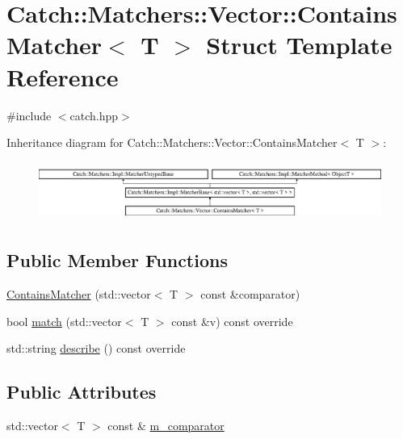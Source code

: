 \hypertarget{structCatch_1_1Matchers_1_1Vector_1_1ContainsMatcher}{}\section{Catch\+:\+:Matchers\+:\+:Vector\+:\+:Contains\+Matcher$<$ T $>$ Struct Template Reference}
\label{structCatch_1_1Matchers_1_1Vector_1_1ContainsMatcher}


{\ttfamily \#include $<$catch.\+hpp$>$}

Inheritance diagram for Catch\+:\+:Matchers\+:\+:Vector\+:\+:Contains\+Matcher$<$ T $>$\+:\begin{figure}[H]
\begin{center}
\leavevmode
\includegraphics[height=1.944444cm]{structCatch_1_1Matchers_1_1Vector_1_1ContainsMatcher}
\end{center}
\end{figure}
\subsection*{Public Member Functions}
\begin{DoxyCompactItemize}
\item 
\mbox{\hyperlink{structCatch_1_1Matchers_1_1Vector_1_1ContainsMatcher_ad8e92c8399be6dce75bb5702cdfab700}{Contains\+Matcher}} (std\+::vector$<$ T $>$ const \&comparator)
\item 
bool \mbox{\hyperlink{structCatch_1_1Matchers_1_1Vector_1_1ContainsMatcher_afd33467ae48a41a634572b41b053f67f}{match}} (std\+::vector$<$ T $>$ const \&v) const override
\item 
std\+::string \mbox{\hyperlink{structCatch_1_1Matchers_1_1Vector_1_1ContainsMatcher_abe6a9ea3d6506c9a1f75ff524f35832e}{describe}} () const override
\end{DoxyCompactItemize}
\subsection*{Public Attributes}
\begin{DoxyCompactItemize}
\item 
std\+::vector$<$ T $>$ const  \& \mbox{\hyperlink{structCatch_1_1Matchers_1_1Vector_1_1ContainsMatcher_a83d051166e4ed0d535219ad6ee99abb2}{m\+\_\+comparator}}
\end{DoxyCompactItemize}
